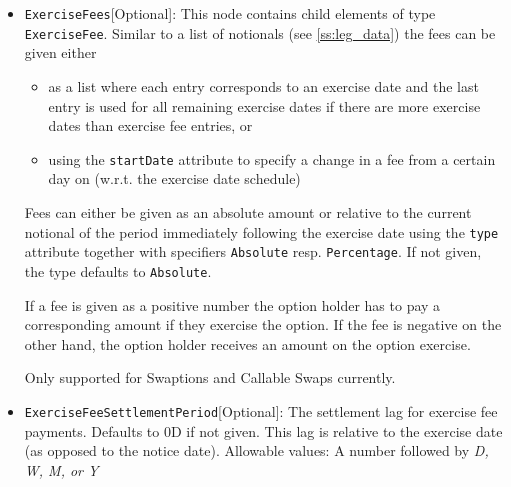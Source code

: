 \begin{itemize}
\emph{PhysicalOTC} = OTC traded swaptions with physical settlement\\
\emph{PhysicalCleared} = Cleared swaptions with physical settlement\\
\emph{CollateralizedCashPrice} = Cash settled swaptions with settlement price calculation using zero coupon curve discounting \\
\emph{ParYieldCurve}  = Cash settled swaptions with settlement price calculation using par yield discounting \footnote{https://www.isda.org/book/2006-isda-definitions/} \footnote{https://www.isda.org/a/TlAEE/Supplement-No-58-to-ISDA-2006-Definitions.pdf} \\

\item \lstinline!ExerciseFees![Optional]: This node contains child elements of type \lstinline!ExerciseFee!. Similar to a list of notionals
  (see \ref{ss:leg_data}) the fees can be given either

  \begin{itemize}
  \item as a list where each entry corresponds to an exercise date and the last entry is used for all remaining exercise
    dates if there are more exercise dates than exercise fee entries, or
  \item using the \verb+startDate+ attribute to specify a change in a fee from a certain day on (w.r.t. the exercise
    date schedule)
  \end{itemize}

  Fees can either be given as an absolute amount or relative to the current notional of the period immediately following
  the exercise date using the \verb+type+ attribute together with specifiers \verb+Absolute+ resp. \verb+Percentage+. If
  not given, the type defaults to \verb+Absolute+.

  If a fee is given as a positive number the option holder has to pay a corresponding amount if they exercise the
  option. If the fee is negative on the other hand, the option holder receives an amount on the option exercise.

  Only supported for Swaptions and Callable Swaps currently.

\item \lstinline!ExerciseFeeSettlementPeriod![Optional]: The settlement lag for exercise fee payments. Defaults to 0D if not
  given. This lag is relative to the exercise date (as opposed to the notice date). Allowable values: A number followed by \emph{D, W, M, or Y}


\end{itemize}
